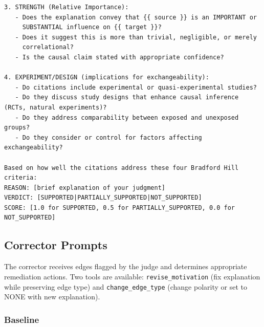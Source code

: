 \begin{lstlisting}[caption={Citation Judge: Mechanistic-Lit Prompt},label={lst:citation_mechanistic_lit}]
3. STRENGTH (Relative Importance):
   - Does the explanation convey that {{ source }} is an IMPORTANT or 
     SUBSTANTIAL influence on {{ target }}?
   - Does it suggest this is more than trivial, negligible, or merely 
     correlational?
   - Is the causal claim stated with appropriate confidence?

4. EXPERIMENT/DESIGN (implications for exchangeability):
   - Do citations include experimental or quasi-experimental studies?
   - Do they discuss study designs that enhance causal inference (RCTs, natural experiments)?
   - Do they address comparability between exposed and unexposed groups?
   - Do they consider or control for factors affecting exchangeability?

Based on how well the citations address these four Bradford Hill criteria:
REASON: [brief explanation of your judgment]
VERDICT: [SUPPORTED|PARTIALLY_SUPPORTED|NOT_SUPPORTED]
SCORE: [1.0 for SUPPORTED, 0.5 for PARTIALLY_SUPPORTED, 0.0 for NOT_SUPPORTED]
\end{lstlisting}

\subsection{Corrector Prompts}
\label{sec:corrector_prompts}

The corrector receives edges flagged by the judge and determines appropriate remediation actions. Two tools are available: \texttt{revise\_motivation} (fix explanation while preserving edge type) and \texttt{change\_edge\_type} (change polarity or set to NONE with new explanation).

\subsubsection{Baseline}

